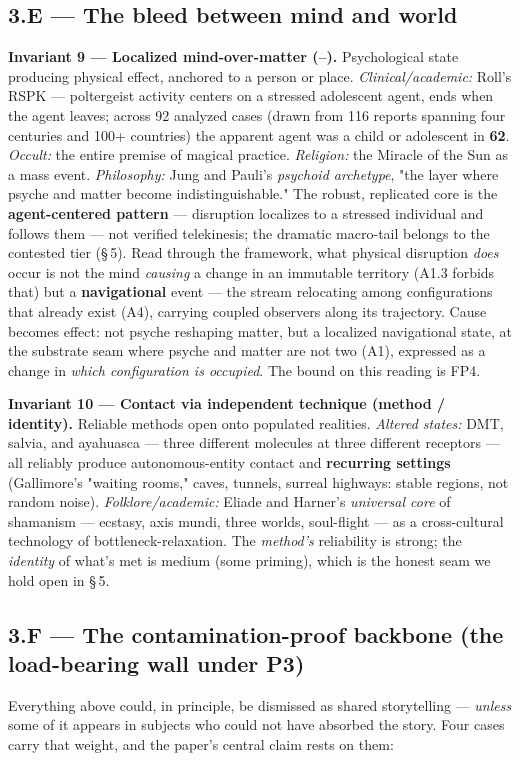 \documentclass[11pt]{article}
\begin{document}
\subsection*{3.E --- The bleed between mind and world}
\textbf{Invariant 9 --- Localized mind-over-matter (\LEFTcircle--\CIRCLE).} Psychological state producing physical effect, anchored to a person or place. \emph{Clinical/academic:} Roll's RSPK --- poltergeist activity centers on a stressed adolescent agent, ends when the agent leaves; across 92 analyzed cases (drawn from 116 reports spanning four centuries and 100+ countries) the apparent agent was a child or adolescent in \textbf{62}. \emph{Occult:} the entire premise of magical practice. \emph{Religion:} the Miracle of the Sun as a mass event. \emph{Philosophy:} Jung and Pauli's \emph{psychoid archetype}, "the layer where psyche and matter become indistinguishable." The robust, replicated core is the \textbf{agent-centered pattern} --- disruption localizes to a stressed individual and follows them --- not verified telekinesis; the dramatic macro-tail belongs to the contested tier (\S\,5). Read through the framework, what physical disruption \emph{does} occur is not the mind \emph{causing} a change in an immutable territory (A1.3 forbids that) but a \textbf{navigational} event --- the stream relocating among configurations that already exist (A4), carrying coupled observers along its trajectory. Cause becomes effect: not psyche reshaping matter, but a localized navigational state, at the substrate seam where psyche and matter are not two (A1), expressed as a change in \emph{which configuration is occupied}. The bound on this reading is FP4.

\textbf{Invariant 10 --- Contact via independent technique (\CIRCLE method / \LEFTcircle identity).} Reliable methods open onto populated realities. \emph{Altered states:} DMT, salvia, and ayahuasca --- three different molecules at three different receptors --- all reliably produce autonomous-entity contact and \textbf{recurring settings} (Gallimore's "waiting rooms," caves, tunnels, surreal highways: stable regions, not random noise). \emph{Folklore/academic:} Eliade and Harner's \emph{universal core} of shamanism --- ecstasy, axis mundi, three worlds, soul-flight --- as a cross-cultural technology of bottleneck-relaxation. The \emph{method's} reliability is strong; the \emph{identity} of what's met is medium (some priming), which is the honest seam we hold open in \S\,5.

\subsection*{3.F --- The contamination-proof backbone (the load-bearing wall under P3)}
Everything above could, in principle, be dismissed as shared storytelling --- \emph{unless} some of it appears in subjects who could not have absorbed the story. Four cases carry that weight, and the paper's central claim rests on them:
\end{document}
